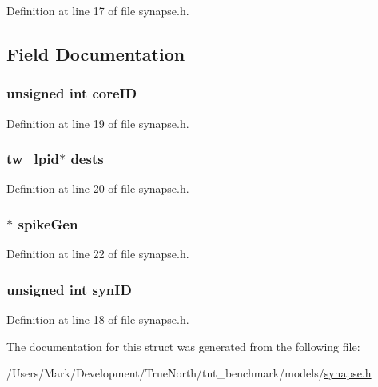 Definition at line 17 of file synapse.\+h.



\subsection{Field Documentation}
\hypertarget{structsynapse_state_a2063050696509e31bdd72dbb0607c6ee}{}
\subsubsection[{core\+I\+D}]{\setlength{\rightskip}{0pt plus 5cm}unsigned int core\+I\+D}\label{structsynapse_state_a2063050696509e31bdd72dbb0607c6ee}


Definition at line 19 of file synapse.\+h.

\hypertarget{structsynapse_state_a6d6a80692ca06baa6c9a11a624129763}{}
\subsubsection[{dests}]{\setlength{\rightskip}{0pt plus 5cm}tw\+\_\+lpid$\ast$ dests}\label{structsynapse_state_a6d6a80692ca06baa6c9a11a624129763}


Definition at line 20 of file synapse.\+h.

\hypertarget{structsynapse_state_a11fd4dc41f715eb6f04a68bc5fc9e292}{}
\subsubsection[{spike\+Gen}]{$\ast$ spike\+Gen}\label{structsynapse_state_a11fd4dc41f715eb6f04a68bc5fc9e292}


Definition at line 22 of file synapse.\+h.

\hypertarget{structsynapse_state_aef661be02823d13d471c66bf0cd478db}{}
\subsubsection[{syn\+I\+D}]{\setlength{\rightskip}{0pt plus 5cm}unsigned int syn\+I\+D}\label{structsynapse_state_aef661be02823d13d471c66bf0cd478db}


Definition at line 18 of file synapse.\+h.



The documentation for this struct was generated from the following file\+:\begin{DoxyCompactItemize}
\item 
/\+Users/\+Mark/\+Development/\+True\+North/tnt\+\_\+benchmark/models/\hyperlink{synapse_8h}{synapse.\+h}\end{DoxyCompactItemize}
